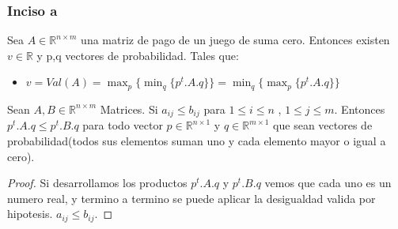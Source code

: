 \subsubsection{Inciso a}
\begin{theorem}[Minimax]
\label{minimax-teo}
	Sea $A \in \mathbb{R}^{n \times m}$ una matriz de pago de un juego de suma cero. Entonces existen $v \in \mathbb{R} $ y p,q vectores de probabilidad. Tales que:
	\begin{itemize}
		\item $v = Val(A) = \displaystyle\max_{p} \{    \displaystyle\min_{q} \{  p^t . A . q \}    \} = \displaystyle\min_{q} \{    \displaystyle\max_{p} \{  p^t . A . q \}    \}$ 
	\end{itemize}
\end{theorem}

\begin{lemma}
\label{lema-fg}
	Sean $A, B \in \mathbb{R}^{n \times m}$ Matrices. Si $a_{ij} \leq b_{ij}$ para $1 \leq i \leq n$   ,  $1 \leq j \leq m$. Entonces $p^t . A . q \leq p^t . B . q$ para todo vector $p \in \mathbb{R}^{n \times 1}$ y $q \in \mathbb{R}^{m \times 1}$ que sean vectores de probabilidad(todos sus elementos suman uno y cada elemento mayor o igual a cero).
\end{lemma}
\begin{proof}
	Si desarrollamos los productos $p^t . A . q$ y $p^t . B . q$ vemos que cada uno es un numero real, y termino a termino se puede aplicar la desigualdad valida por hipotesis. $a_{ij} \leq b_{ij}$.
\end{proof}

